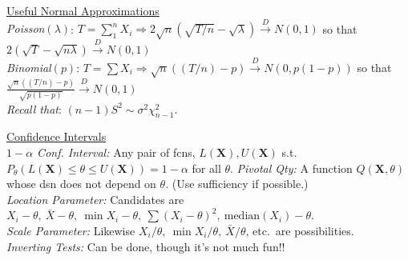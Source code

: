 \documentclass[11pt]{article}
\newcommand{\vecX}{\ensuremath{\mathbf{X}}}
\begin{document}
\indent\underline{Useful Normal Approximations}\\
{\it Poisson$(\lambda)$}: $T=\sum_1^n X_i \Longrightarrow
2\sqrt{n}(\sqrt{T/n} -
\sqrt{\lambda})\stackrel{D}{\longrightarrow} N(0,1)$ so that $2(\sqrt{T} -
\sqrt{n\lambda})\stackrel{D}{\longrightarrow} N(0,1)$\\
%
{\it Binomial$(p)$}: $T=\sum X_i \Longrightarrow \sqrt{n} ((T/n) - p) \stackrel{D}{\longrightarrow}
N(0,p(1-p))$ so that $\frac{\sqrt{n}((T/n) - p)}{\sqrt{p(1-p)}}\stackrel{D}{\longrightarrow}
N(0,1)$\\
{\it Recall that}: $(n-1)S^2 \sim \sigma^2 \chi^2_{n-1}$.

\indent\underline{Confidence Intervals}\\
{\it $1-\alpha$ Conf. Interval:}  Any pair of fcns, $L(\vecX), U(\vecX)$  s.t.\
$P_\theta(L(\vecX)\leq\theta\leq U(\vecX)) = 1-\alpha$ for all $\theta$.
%
{\it Pivotal Qty:}  A function $Q(\vecX,\theta)$ whose dsn does not depend on $\theta$.  (Use
sufficiency if possible.)\\
\hspace*{1.5em}\textsl{Location Parameter:} Candidates are $X_i-\theta,\ \bar{X}-\theta,\ \min
X_i-\theta,\ \sum(X_i-\theta)^2,\ \mathrm{median}(X_i)-\theta$.\\
%
\hspace*{1.5em}\textsl{Scale Parameter:} Likewise $X_i/\theta,\ \min X_i/\theta,\
\bar{X}/\theta$, etc.\ are possibilities.\\
{\it Inverting Tests:} Can be done, though it's not much fun!!
\pagebreak
\end{document}
